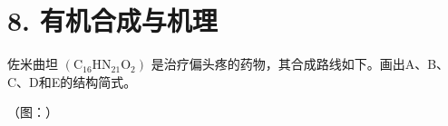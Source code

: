 \section*{8. 有机合成与机理}
佐⽶曲坦 $\left( \mathrm { C _ { 1 6 } H N _ { 2 1 } O _ { 2 } } \right)$ 是治疗偏头疼的药物，其合成路线如下。画出A、B、C、D和E的结构简式。

（图：）
